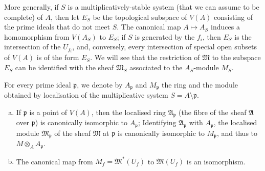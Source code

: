 \documentclass{article}
\theoremstyle{plain}
\newenvironment{theorem}[1]
    {\renewcommand\theinnercustomtheorem{#1}\innercustomtheorem}
    {\endinnercustomtheorem}
\newcommand{\oldpage}[1]{\marginpar{\footnotesize$\Big\vert$ \textit{p.~#1}}}
\begin{document}
More generally, if $S$ is a multiplicatively-stable system (that we can assume to be complete) of $A$, then let $E_S$ be the topological subspace of $V(A)$ consisting of the prime ideals that do not meet $S$.
The canonical map $A\mapsto A_S$ induces a homomorphism from $V(A_S)$ to $E_S$;
if $S$ is generated by the $f_i$,
\oldpage{1-05}
then $E_S$ is the intersection of the $U_{f_i}$, and, conversely, every intersection of special open subsets of $V(A)$ is of the form $E_S$.
We will see that the restriction of $\mathfrak{M}$ to the subspace $E_S$ can be identified with the sheaf $\mathfrak{M}_S$ associated to the $A_S$-module $M_S$.

For every prime ideal $\mathfrak{p}$, we denote by $A_\mathfrak{p}$ and $M_\mathfrak{p}$ the ring and the module obtained by localisation of the multiplicative system $S=A\setminus\mathfrak{p}$.

\begin{theorem}{1}
\label{theroem1}
  \begin{enumerate}[(a)]
    \item If $\mathfrak{p}$ is a point of $V(A)$, then the localised ring $\mathfrak{A}_\mathfrak{p}$ (the fibre of the sheaf $\mathfrak{A}$ over $\mathfrak{p}$) is canonically isomorphic to $A_\mathfrak{p}$;
      Identifying $\mathfrak{A}_\mathfrak{p}$ with $A_\mathfrak{p}$, the localised module $\mathfrak{M}_\mathfrak{p}$ of the sheaf $\mathfrak{M}$ at $\mathfrak{p}$ is canonically isomorphic to $M_\mathfrak{p}$, and thus to $M\otimes_A A_\mathfrak{p}$.
    \item The canonical map from $M_f=\mathfrak{M}^*(U_f)$ to $\mathfrak{M}(U_f)$ is an isomorphism.
  \end{enumerate}
\end{theorem}
\end{document}
